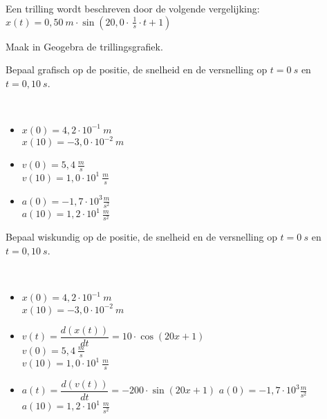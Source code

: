\documentclass{ximera}
\begin{document}
\begin{exercise}   
	Een trilling wordt beschreven door de volgende vergelijking: \\
$x(t)=0,50\ m \cdot \sin(20,0\cdot \ \frac{1}{s}\cdot t+1)$

\begin{question}
    Maak in Geogebra de trillingsgrafiek. 
\end{question}

\begin{question}
    Bepaal grafisch op de positie, de snelheid en de versnelling op $t=0\ s$ en $t=0,10 \ s$.
    \begin{oplossing} \ \\
        \begin{itemize}
            \item   $x(0)=4,2\cdot 10^{-1} \ m$  \\
                    $x(10)=-3,0\cdot 10^{-2} \ m$
            \item   $v(0)=5,4\ \frac{m}{s}$  \\
                    $v(10)=1,0\cdot 10^{1} \ \frac{m}{s}$
            \item   $a(0)=-1,7\cdot 10^{3} \frac{m}{s^2}$  \\
                    $a(10)=1,2\cdot 10^{1} \ \frac{m}{s^2}$
        \end{itemize}
    \end{oplossing}
\end{question}

\begin{question}
    Bepaal wiskundig op de positie, de snelheid en de versnelling op $t=0\ s$ en $t=0,10 \ s$.
    \begin{oplossing} \ \\
        \begin{itemize}
            \item   $x(0)=4,2\cdot 10^{-1} \ m$  \\
                    $x(10)=-3,0\cdot 10^{-2} \ m$
            \item   $v(t)=\dfrac{d(x(t))}{dt}=10\cdot \cos(20x+1)$ \\
                    $v(0)=5,4\ \frac{m}{s}$  \\
                    $v(10)=1,0\cdot 10^{1} \ \frac{m}{s}$
            \item   $a(t)=\dfrac{d(v(t))}{dt}=-200\cdot \sin(20x+1)$
                    $a(0)=-1,7\cdot 10^{3} \frac{m}{s^2}$  \\
                    $a(10)=1,2\cdot 10^{1} \ \frac{m}{s^2}$
        \end{itemize}
    \end{oplossing}

\end{question}

\end{exercise}
\end{document}
